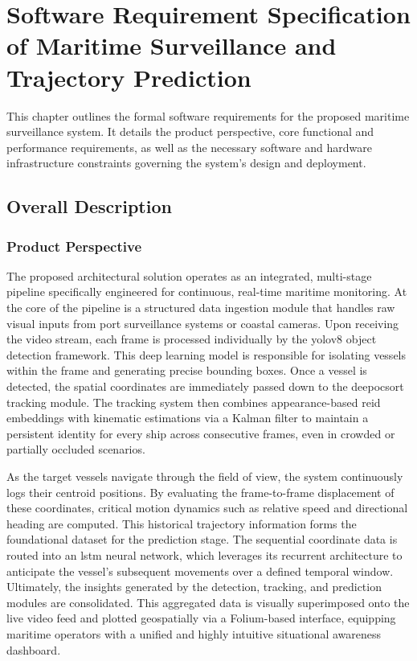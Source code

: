 \chapter{Software Requirement Specification of Maritime Surveillance and Trajectory Prediction}

This chapter outlines the formal software requirements for the proposed maritime surveillance system. It details the product perspective, core functional and performance requirements, as well as the necessary software and hardware infrastructure constraints governing the system's design and deployment.

\section{Overall Description}

\subsection{Product Perspective}
The proposed architectural solution operates as an integrated, multi-stage pipeline specifically engineered for continuous, real-time maritime monitoring. At the core of the pipeline is a structured data ingestion module that handles raw visual inputs from port surveillance systems or coastal cameras. Upon receiving the video stream, each frame is processed individually by the \gls{yolov8} object detection framework. This deep learning model is responsible for isolating vessels within the frame and generating precise bounding boxes. Once a vessel is detected, the spatial coordinates are immediately passed down to the \gls{deepocsort} tracking module. The tracking system then combines appearance-based \gls{reid} embeddings with kinematic estimations via a Kalman filter to maintain a persistent identity for every ship across consecutive frames, even in crowded or partially occluded scenarios.

As the target vessels navigate through the field of view, the system continuously logs their centroid positions. By evaluating the frame-to-frame displacement of these coordinates, critical motion dynamics such as relative speed and directional heading are computed. This historical trajectory information forms the foundational dataset for the prediction stage. The sequential coordinate data is routed into an \gls{lstm} neural network, which leverages its recurrent architecture to anticipate the vessel's subsequent movements over a defined temporal window. Ultimately, the insights generated by the detection, tracking, and prediction modules are consolidated. This aggregated data is visually superimposed onto the live video feed and plotted geospatially via a Folium-based interface, equipping maritime operators with a unified and highly intuitive situational awareness dashboard.

